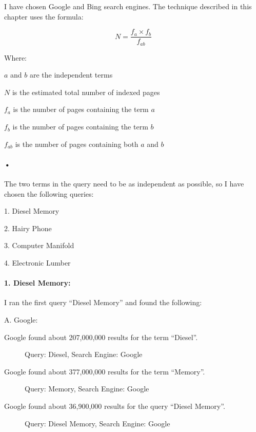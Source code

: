 \documentclass[a4paper, 11pt]{article}
\begin{document}
I have chosen Google and Bing search engines. The technique described in this chapter uses the formula:

$$
N=\frac{f_a \times f_b}{f_{ab}}
$$

Where:

$a$ and $b$ are the independent terms

$N$ is the estimated total number of indexed pages

$f_a$ is the number of pages containing the term $a$

$f_b$ is the number of pages containing the term $b$

$f_{ab}$ is the number of pages containing both $a$ and $b$

\paragraph{•}
The two terms in the query need to be as independent as possible, so I have chosen the following queries:

1. Diesel Memory

2. Hairy Phone

3. Computer Manifold

4. Electronic Lumber

\paragraph{1. Diesel Memory:}
I ran the first query ``Diesel Memory'' and found the following:

A. Google:

\pagebreak
Google found about 207,000,000 results for the term ``Diesel''.
\begin{figure}[h]
\caption{Query: Diesel, Search Engine: Google}
\centering
\end{figure}

\pagebreak
Google found about 377,000,000 results for the term ``Memory''.
\begin{figure}[h]
\caption{Query: Memory, Search Engine: Google}
\centering
\end{figure}

\pagebreak
Google found about 36,900,000 results for the query ``Diesel Memory''.
\begin{figure}[h]
\caption{Query: Diesel Memory, Search Engine: Google}
\centering
\end{figure}
\end{document}

